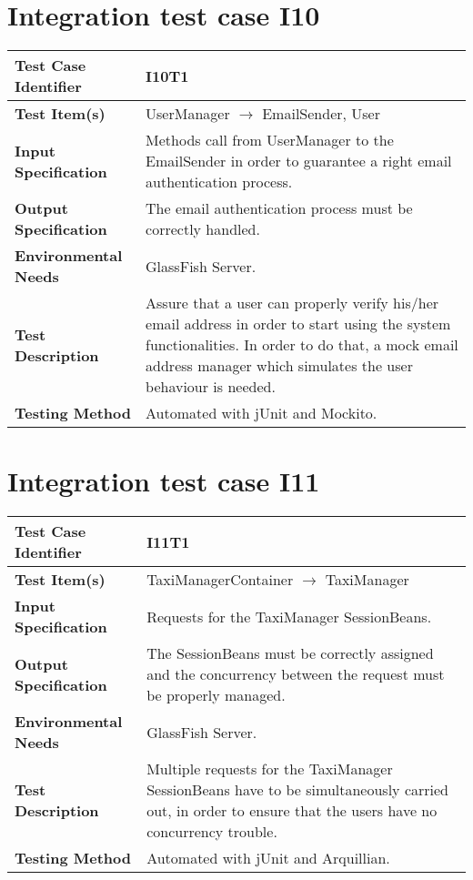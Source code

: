 \vspace{2em}

\section{Integration test case I10}

\begin{tabular}{l p{}}
    \hline
    \textbf{Test Case Identifier} & I10T1\\
    \hline
    \textbf{Test Item(s)} & UserManager $\rightarrow$ EmailSender, User \\
    \hline
    \textbf{Input Specification} & Methods call from UserManager to the EmailSender in order to guarantee a right email authentication process.\\
    \hline
    \textbf{Output Specification} & The email authentication process must be correctly handled.\\
    \hline
    \textbf{Environmental Needs} & GlassFish Server.\\
    \hline
    \textbf{Test Description} & Assure that a user can properly verify his/her email address in order to start using the system functionalities. In order to do that, a mock email address manager which simulates the user behaviour is needed.\\
    \hline
    \textbf{Testing Method} & Automated with jUnit and Mockito.\\
    \hline
\end{tabular}

\vspace{2em}

\section{Integration test case I11}

\begin{tabular}{l p{}}
    \hline
    \textbf{Test Case Identifier} & I11T1\\
    \hline
    \textbf{Test Item(s)} & TaxiManagerContainer $\rightarrow$ TaxiManager \\
    \hline
    \textbf{Input Specification} & Requests for the TaxiManager SessionBeans.\\
    \hline
    \textbf{Output Specification} & The SessionBeans must be correctly assigned and  the concurrency between the request must be properly managed.\\
    \hline
    \textbf{Environmental Needs} & GlassFish Server.\\
    \hline
    \textbf{Test Description} & Multiple requests for the TaxiManager SessionBeans have to be simultaneously carried out, in order to ensure that the users have no concurrency trouble.\\
    \hline
    \textbf{Testing Method} & Automated with jUnit and Arquillian.\\
    \hline
\end{tabular}

